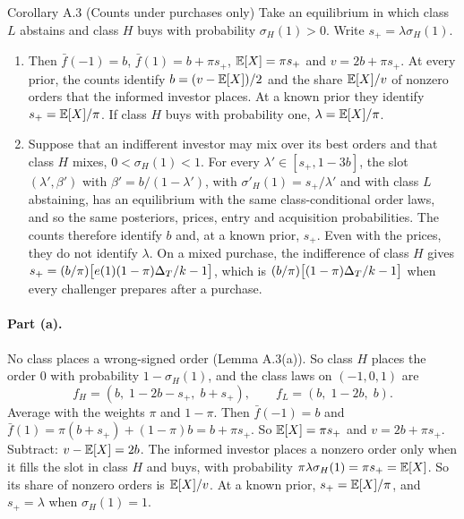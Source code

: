 \begin{paperresult}{Corollary A.3 (Counts under purchases only)}
Take an equilibrium in which class \(L\) abstains and class \(H\) buys with probability \(\sigma_H(1)>0\). Write \(s_+=\lambda\sigma_H(1)\).
\begin{enumerate}[label=(\alph*),leftmargin=2em]
\item Then \(\bar f(-1)=b\), \(\bar f(1)=b+\pi s_+\), \(\mathbb{E}[X]=\pi s_+\) and \(v=2b+\pi s_+\). At every prior, the counts identify \(b=(v-\mathbb{E}[X])/2\) and the share \(\mathbb{E}[X]/v\) of nonzero orders that the informed investor places. At a known prior they identify \(s_+=\mathbb{E}[X]/\pi\). If class \(H\) buys with probability one, \(\lambda=\mathbb{E}[X]/\pi\).
\item Suppose that an indifferent investor may mix over its best orders and that class \(H\) mixes, \(0<\sigma_H(1)<1\). For every \(\lambda'\in[s_+,1-3b]\), the slot \((\lambda',\beta')\) with \(\beta'=b/(1-\lambda')\), with \(\sigma'_H(1)=s_+/\lambda'\) and with class \(L\) abstaining, has an equilibrium with the same class-conditional order laws, and so the same posteriors, prices, entry and acquisition probabilities. The counts therefore identify \(b\) and, at a known prior, \(s_+\). Even with the prices, they do not identify \(\lambda\). On a mixed purchase, the indifference of class \(H\) gives \(s_+=(b/\pi)\bigl[e(1)(1-\pi)\Delta_T/k-1\bigr]\), which is \((b/\pi)\bigl[(1-\pi)\Delta_T/k-1\bigr]\) when every challenger prepares after a purchase.
\end{enumerate}
\end{paperresult}

\paragraph{Part (a).} No class places a wrong-signed order (Lemma A.3(a)). So class \(H\) places the order \(0\) with probability \(1-\sigma_H(1)\), and the class laws on \((-1,0,1)\) are
\[
f_H=(b,\;1-2b-s_+,\;b+s_+),\qquad f_L=(b,\;1-2b,\;b).
\]
Average with the weights \(\pi\) and \(1-\pi\). Then \(\bar f(-1)=b\) and \(\bar f(1)=\pi(b+s_+)+(1-\pi)b=b+\pi s_+\). So \(\mathbb{E}[X]=\pi s_+\) and \(v=2b+\pi s_+\). Subtract: \(v-\mathbb{E}[X]=2b\). The informed investor places a nonzero order only when it fills the slot in class \(H\) and buys, with probability \(\pi\lambda\sigma_H(1)=\pi s_+=\mathbb{E}[X]\). So its share of nonzero orders is \(\mathbb{E}[X]/v\). At a known prior, \(s_+=\mathbb{E}[X]/\pi\), and \(s_+=\lambda\) when \(\sigma_H(1)=1\).

